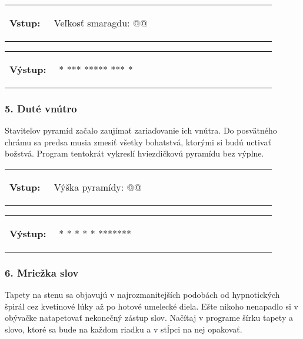\begin{tabular}{@{}p{0.15\linewidth}p{0.75\linewidth}}
\textbf{\small Vstup:} &
\vspace{-3em}
\begin{code}
Veľkosť smaragdu: @\fbox{5}@
\end{code}
\end{tabular}

\vspace{-2em}
\begin{tabular}{@{}p{0.15\linewidth}p{0.75\linewidth}}
\textbf{\small Výstup:} &
\vspace{-3em}
\begin{code}
  *
 ***
*****
 ***
  *
\end{code}
\end{tabular}
\vspace{-2em}

\subsubsection*{5. Duté vnútro}
Staviteľov pyramíd začalo zaujímať zariaďovanie ich vnútra. Do posvätného chrámu sa predsa musia zmesiť všetky bohatstvá, ktorými si budú uctivať božstvá. Program tentokrát vykreslí hviezdičkovú pyramídu bez výplne.

\begin{tabular}{@{}p{0.15\linewidth}p{0.75\linewidth}}
\textbf{\small Vstup:} &
\vspace{-3em}
\begin{code}
Výška pyramídy: @\fbox{4}@
\end{code}
\end{tabular}

\vspace{-2em}
\begin{tabular}{@{}p{0.15\linewidth}p{0.75\linewidth}}
\textbf{\small Výstup:} &
\vspace{-3em}
\begin{code}
    *
   * *
  *   *
 *******
\end{code}
\end{tabular}
\vspace{-2em}


\subsubsection*{6. Mriežka slov}
Tapety na stenu sa objavujú v najrozmanitejších podobách od hypnotických špirál cez kvetinové lúky až po hotové umelecké diela. Ešte nikoho nenapadlo si v obývačke natapetovať nekonečný zástup slov. Načítaj v programe šírku tapety a slovo, ktoré sa bude na každom riadku a v stĺpci na nej opakovať.

